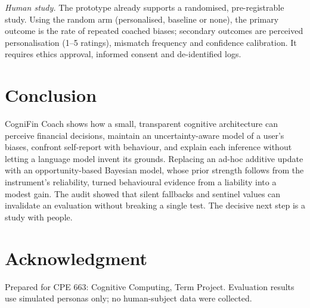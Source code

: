 \documentclass[conference]{IEEEtran}
\begin{document}
\textit{Human study.} The prototype already supports a randomised, pre-registrable study. Using the random arm (personalised, baseline or none), the primary outcome is the rate of repeated coached biases; secondary outcomes are perceived personalisation (1--5 ratings), mismatch frequency and confidence calibration. It requires ethics approval, informed consent and de-identified logs.

\section{Conclusion}
CogniFin Coach shows how a small, transparent cognitive architecture can perceive financial decisions, maintain an uncertainty-aware model of a user's biases, confront self-report with behaviour, and explain each inference without letting a language model invent its grounds. Replacing an ad-hoc additive update with an opportunity-based Bayesian model, whose prior strength follows from the instrument's reliability, turned behavioural evidence from a liability into a modest gain. The audit showed that silent fallbacks and sentinel values can invalidate an evaluation without breaking a single test. The decisive next step is a study with people.

\section*{Acknowledgment}
Prepared for CPE 663: Cognitive Computing, Term Project. Evaluation results use simulated personas only; no human-subject data were collected.
\end{document}
